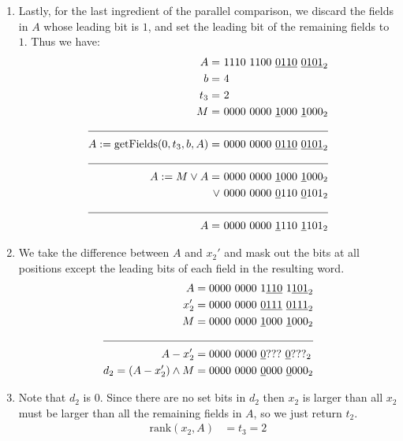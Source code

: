 \begin{itemize}
\begin{enumerate}
        \item
        Lastly, for the last ingredient of the parallel comparison, we discard the fields in $A$ whose leading bit is $1$, and set the leading bit of the remaining fields to $1$. Thus we have:
        \begin{align*}
            A = &\ 1110\ 1100\ \underline{0110}\ \underline{0101}_2 \\
            b = &\ 4 \\
            t_3 = &\ 2 \\ 
            M = &\ 0000\ 0000\ \underline{1}000\ \underline{1}000_2 \\
            \cline{1-2}
            A := \text{getFields}(0, t_3, b, A) = &\ 0000\ 0000\ \underline{0110}\ \underline{0101}_2 \\
            \cline{1-2}
            A := M \vee A = &\ 0000\ 0000\ \underline{1}000\ \underline{1}000_2 \\
            \vee &\ 0000\ 0000\ \underline{0}110\ \underline{0}101_2 \\
            \cline{1-2}
            A = &\ 0000\ 0000\ \underline{1}110\ \underline{1}101_2
        \end{align*}
        
        \item
        We take the difference between $A$ and $x_2'$ and mask out the bits at all positions except the leading bits of each field in the resulting word.
        \begin{align*}
            A &= 0000\ 0000\ 1\underline{110}\ 1\underline{101}_2 \\
            x_2' &= 0000\ 0000\ \underline{0111}\ \underline{0111}_2 \\
            M &= 0000\ 0000\ \underline{1}000\ \underline{1}000_2 \\
            \cline{1-2}
            A - x_2' &= 0000\ 0000\ \underline{0}???\ \underline{0}???_2 \\
            d_2 = (A - x_2') \wedge M &= 0000\ 0000\ \underline{0}000\ \underline{0}000_2 \\
        \end{align*}
        
        \item
        Note that $d_2$ is $0$. Since there are no set bits in $d_2$ then $x_2$ is larger than all $x_2$ must be larger than all the remaining fields in $A$, so we just return $t_2$.
        \begin{align*}
            \text{rank}(x_2,A) &= t_3 = 2
        \end{align*}
        
    \end{enumerate}
\end{itemize}

